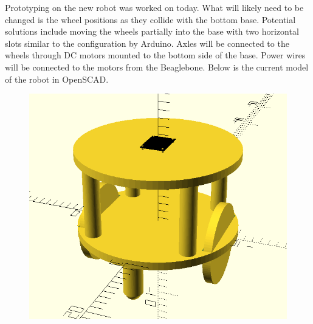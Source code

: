 \documentclass[fontsize=11pt, %
                             paper=a4, %
                             twoside, %
                             captions=tableheading,
                             index=totoc,
                             hyperref]{labbook}
\begin{document}
\begin{addmargin}[0cm]{0cm}
Prototyping on the new robot was worked on today. What will likely need to be changed is the wheel positions as they collide with the bottom base. Potential solutions include moving the wheels partially into the base with two horizontal slots similar to the configuration by Arduino. Axles will be connected to the wheels through DC motors mounted to the bottom side of the base. Power wires will be connected to the motors from the Beaglebone. Below is the current model of the robot in OpenSCAD.
\begin{figure}[H]
\center
\includegraphics[scale=0.5]{figs/img/cleaningRobotModel7152020}
\end{figure}


\end{addmargin}
\end{document}
